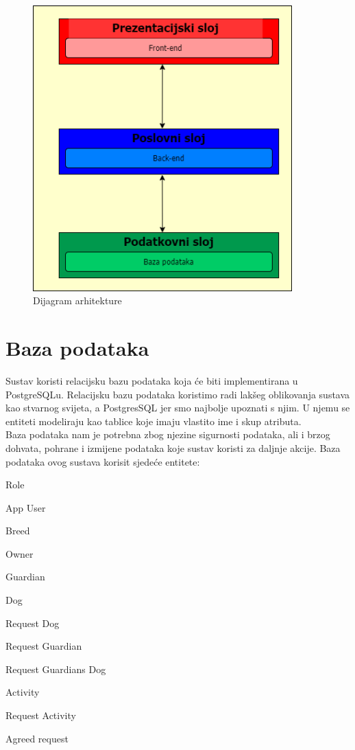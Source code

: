 		\begin{figure}[htb]
			\centering
			\includegraphics[width=10cm]{slike/arhitektura-diagram}
			\caption{Dijagram arhitekture} 
			\label{fig:arhitektura-dijagram}
		\end{figure}
		

	
		

		
		\eject
				
		\section{Baza podataka}
			
			Sustav koristi relacijsku bazu podataka koja će biti implementirana u PostgreSQLu. Relacijsku bazu podataka koristimo radi lakšeg oblikovanja sustava kao stvarnog svijeta, a PostgresSQL jer smo najbolje upoznati s njim. U njemu se entiteti modeliraju kao tablice koje imaju vlastito ime i skup atributa.\\
			Baza podataka nam je potrebna zbog njezine sigurnosti podataka, ali i brzog dohvata, pohrane i izmijene podataka koje sustav koristi za daljnje akcije.
			Baza podataka ovog sustava korisit sjedeće entitete:
			\begin{packed_item}
				\item Role
				\item App User
				\item Breed
				\item Owner
				\item Guardian
				\item Dog
				\item Request Dog
				\item Request Guardian
				\item Request Guardians Dog
				\item Activity
				\item Request Activity
				\item Agreed request
				
			\end{packed_item}
			
